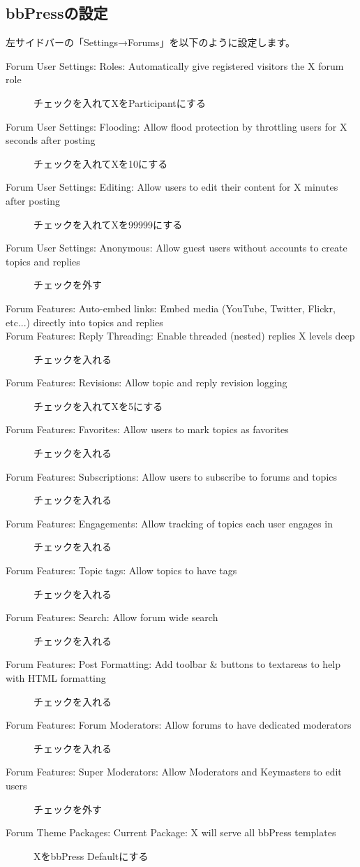 \documentclass[titlepage,10pt,a4paper,uplatex]{jsbook}
\begin{document}
\subsection{bbPressの設定}

左サイドバーの「Settings→Forums」を以下のように設定します。

\begin{description}
\item[Forum User Settings: Roles: Automatically give registered visitors the X forum role] チェックを入れてXをParticipantにする
\item[Forum User Settings: Flooding: Allow flood protection by throttling users for X seconds after posting] チェックを入れてXを10にする
\item[Forum User Settings: Editing: Allow users to edit their content for X minutes after posting] チェックを入れてXを99999にする
\item[Forum User Settings: Anonymous: Allow guest users without accounts to create topics and replies] チェックを外す
\item[Forum Features: Auto-embed links: Embed media (YouTube, Twitter, Flickr, etc...) directly into topics and replies] 
\item[Forum Features: Reply Threading: Enable threaded (nested) replies X levels deep] チェックを入れる
\item[Forum Features: Revisions: Allow topic and reply revision logging] チェックを入れてXを5にする
\item[Forum Features: Favorites: Allow users to mark topics as favorites] チェックを入れる
\item[Forum Features: Subscriptions: Allow users to subscribe to forums and topics] チェックを入れる
\item[Forum Features: Engagements: Allow tracking of topics each user engages in] チェックを入れる
\item[Forum Features: Topic tags: Allow topics to have tags] チェックを入れる
\item[Forum Features: Search: Allow forum wide search] チェックを入れる
\item[Forum Features: Post Formatting: Add toolbar \& buttons to textareas to help with HTML formatting] チェックを入れる
\item[Forum Features: Forum Moderators: Allow forums to have dedicated moderators] チェックを入れる
\item[Forum Features: Super Moderators: Allow Moderators and Keymasters to edit users] チェックを外す
\item[Forum Theme Packages: Current Package: X will serve all bbPress templates] XをbbPress Defaultにする

\end{description}
\end{document}
